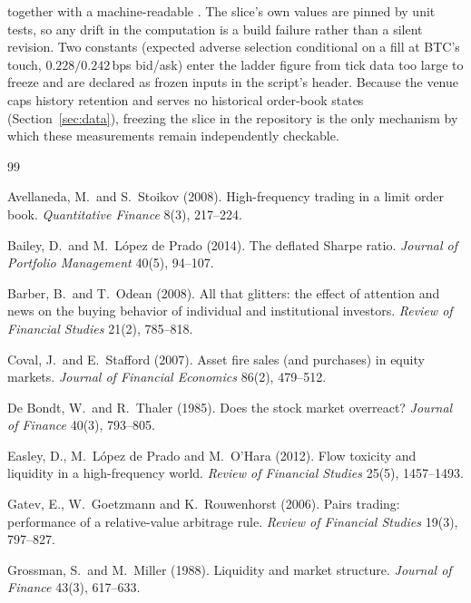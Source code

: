 \documentclass[11pt,a4paper]{article}
\newcommand{\code}[1]{\texttt{\detokenize{#1}}}
\begin{document}
\noindent together with a machine-readable \code{headlines.json}. The
slice's own values are pinned by unit tests, so any drift in the
computation is a build failure rather than a silent revision. Two
constants (expected adverse selection conditional on a fill at BTC's
touch, $0.228/0.242$\,bps bid/ask) enter the ladder figure from tick
data too large to freeze and are declared as frozen inputs in the
script's header. Because the venue caps history retention and serves no
historical order-book states (Section~\ref{sec:data}), freezing the
slice in the repository is the only mechanism by which these
measurements remain independently checkable.

\renewcommand{\refname}{References}
\begin{thebibliography}{99}\small

Avellaneda, M.\ and S.\ Stoikov (2008). High-frequency trading in a
limit order book. \emph{Quantitative Finance} 8(3), 217--224.

Bailey, D.\ and M.\ L\'opez de Prado (2014). The deflated Sharpe
ratio. \emph{Journal of Portfolio Management} 40(5), 94--107.

Barber, B.\ and T.\ Odean (2008). All that glitters: the effect of
attention and news on the buying behavior of individual and
institutional investors. \emph{Review of Financial Studies} 21(2),
785--818.

Coval, J.\ and E.\ Stafford (2007). Asset fire sales (and purchases)
in equity markets. \emph{Journal of Financial Economics} 86(2),
479--512.

De Bondt, W.\ and R.\ Thaler (1985). Does the stock market overreact?
\emph{Journal of Finance} 40(3), 793--805.

Easley, D., M.\ L\'opez de Prado and M.\ O'Hara (2012). Flow toxicity
and liquidity in a high-frequency world. \emph{Review of Financial
Studies} 25(5), 1457--1493.

Gatev, E., W.\ Goetzmann and K.\ Rouwenhorst (2006). Pairs trading:
performance of a relative-value arbitrage rule. \emph{Review of
Financial Studies} 19(3), 797--827.

Grossman, S.\ and M.\ Miller (1988). Liquidity and market structure.
\emph{Journal of Finance} 43(3), 617--633.


\end{thebibliography}
\end{document}
